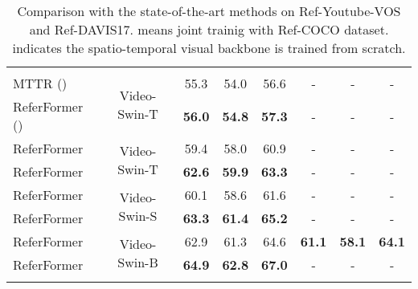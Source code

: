 \documentclass[10pt,twocolumn,letterpaper]{article}
\begin{document}
{\begin{table*}[t]
\begin{center}
\begin{tabular}{l | c | c c c | c c c}
\arrayrulecolor{white}\hline
\arrayrulecolor{black}\hline
\arrayrulecolor{white}\hline

\multicolumn{8}{l}{\textbf{Spatio-temporal Visual Backbones}} \\

\arrayrulecolor{white}\hline
\arrayrulecolor{black}\hline
\arrayrulecolor{white}\hline

MTTR ()  ~\cite{botach2021mttr} & \multirow{2}{*}{Video-Swin-T} & 55.3 & 54.0 & 56.6 & - & - & - \\
ReferFormer  () &  & \textbf{56.0} & \textbf{54.8} & \textbf{57.3} & - & - & - \\     


\arrayrulecolor{white}\hline
\arrayrulecolor{black}\hline
\arrayrulecolor{white}\hline

ReferFormer & \multirow{2}{*}{Video-Swin-T} & 59.4 & 58.0 & 60.9 & - & - & - \\
ReferFormer & & \textbf{62.6} & \textbf{59.9} & \textbf{63.3} & - & - & - \\

\arrayrulecolor{white}\hline
\arrayrulecolor{black}\hline
\arrayrulecolor{white}\hline

ReferFormer & \multirow{2}{*}{Video-Swin-S} & 60.1 & 58.6 & 61.6 & - & - & - \\
ReferFormer & & \textbf{63.3} & \textbf{61.4} & \textbf{65.2} & - & - & - \\

\arrayrulecolor{white}\hline
\arrayrulecolor{black}\hline
\arrayrulecolor{white}\hline

ReferFormer & \multirow{2}{*}{Video-Swin-B} & 62.9 & 61.3 & 64.6 & \textbf{61.1} & \textbf{58.1} & \textbf{64.1} \\
ReferFormer & & \textbf{64.9} & \textbf{62.8} & \textbf{67.0} & - & - & - \\

\arrayrulecolor{white}\hline
\arrayrulecolor{black}\hline
\arrayrulecolor{white}\hline



\end{tabular}     \end{center}
    \vspace{-4mm}
    \caption{Comparison with the state-of-the-art methods on Ref-Youtube-VOS and Ref-DAVIS17.  means joint trainig with Ref-COCO dataset.  indicates the spatio-temporal visual backbone is trained from scratch.}
    \label{tab:main_table}
    \vspace{-2mm}
\end{table*}


}
\end{document}
